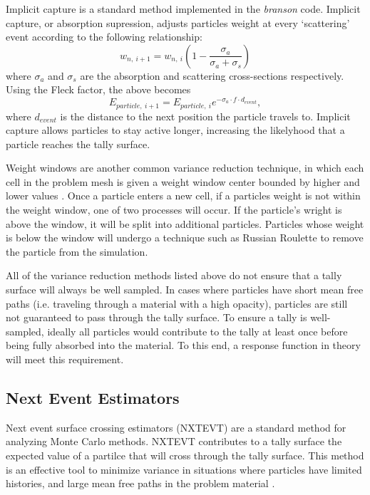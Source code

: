\documentclass[]{article}
\begin{document}
		Implicit capture is a standard method implemented in the \textit{branson} code. Implicit capture, or absorption supression, adjusts particles weight at every `scattering' event according to the following relationship:
		\begin{equation}
			w_{n,~i+1} = w_{n,~i}(1 - \frac{\sigma_{a}}{\sigma_{a} + \sigma_{s}})
		\end{equation}
		where $\sigma_{a}$ and $\sigma_{s}$ are the absorption and scattering cross-sections respectively. Using the Fleck factor, the above becomes
		\begin{equation} \label{Eq: new_E}
			E_{particle,~i+1} = E_{particle,~i}e^{-\sigma_{a} \cdot f \cdot d_{event}},
		\end{equation}
		where $d_{event}$ is the distance to the next position the particle travels to. Implicit capture allows particles to stay active longer, increasing the likelyhood that a particle reaches the tally surface.

		Weight windows are another common variance reduction technique, in which each cell in the problem mesh is given a weight window center bounded by higher and lower values \cite{JL16}. Once a particle enters a new cell, if a particles weight is not within the weight window, one of two processes will occur. If the particle's wright is above the window, it will be split into additional particles. Particles whose weight is below the window will undergo a technique such as Russian Roulette \cite{LM93} to remove the particle from the simulation.

		All of the variance reduction methods listed above do not ensure that a tally surface will always be well sampled. In cases where particles have short mean free paths (i.e. traveling through a material with a high opacity), particles are still not guaranteed to pass through the tally surface. To ensure a tally is  well-sampled, ideally all particles would contribute to the tally at least once before being fully absorbed into the material. To this end, a response function in theory will meet this requirement.

	\subsection{Next Event Estimators}
		Next event surface crossing estimators (NXTEVT) are a standard method for analyzing Monte Carlo methods. NXTEVT contributes to a tally surface the expected value of a partilce that will cross through the tally surface. This method is an effective tool to minimize variance in situations where particles have limited histories, and large mean free paths in the problem material \cite{WD11, LL99, LL05}. 
		
\end{document}
